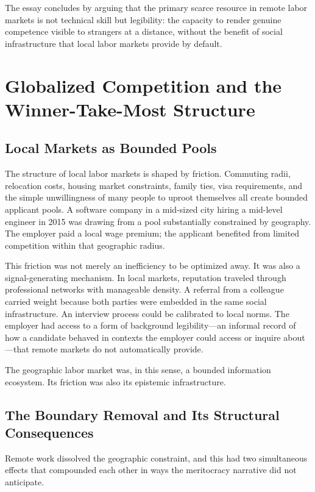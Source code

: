 \documentclass[12pt, a4paper]{article}
\theoremstyle{plain}
\theoremstyle{definition}
\theoremstyle{remark}
\begin{document}
The essay concludes by arguing that the primary scarce resource in remote labor markets
is not technical skill but legibility: the capacity to render genuine competence
visible to strangers at a distance, without the benefit of social infrastructure
that local labor markets provide by default.

\section{Globalized Competition and the Winner-Take-Most Structure}
\label{sec:competition}

\subsection{Local Markets as Bounded Pools}

The structure of local labor markets is shaped by friction.
Commuting radii, relocation costs, housing market constraints,
family ties, visa requirements, and the simple unwillingness of many people
to uproot themselves all create bounded applicant pools.
A software company in a mid-sized city hiring a mid-level engineer
in 2015 was drawing from a pool substantially constrained by geography.
The employer paid a local wage premium; the applicant benefited from
limited competition within that geographic radius.

This friction was not merely an inefficiency to be optimized away.
It was also a signal-generating mechanism.
In local markets, reputation traveled through professional networks
with manageable density. A referral from a colleague carried weight because
both parties were embedded in the same social infrastructure.
An interview process could be calibrated to local norms.
The employer had access to a form of background legibility---an informal record
of how a candidate behaved in contexts the employer could access or inquire about---that
remote markets do not automatically provide.

The geographic labor market was, in this sense, a bounded information ecosystem.
Its friction was also its epistemic infrastructure.

\subsection{The Boundary Removal and Its Structural Consequences}

Remote work dissolved the geographic constraint, and this had two simultaneous effects
that compounded each other in ways the meritocracy narrative did not anticipate.
\end{document}
